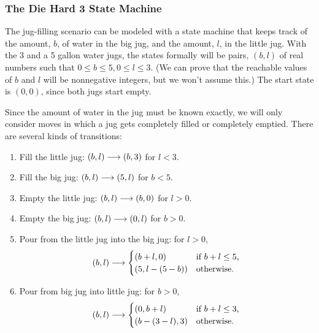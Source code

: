 \subsubsection{The Die Hard 3 State Machine}
The jug-filling scenario can be modeled with a state machine that keeps
track of the amount, $b$, of water in the big jug, and the amount, $l$,
in the little jug.  With the 3 and a 5 gallon water jugs, the states
formally will be pairs, $(b,l)$ of real numbers such that $0 \leq b \leq
5, 0 \leq l \leq 3$.  (We can prove that the reachable values of $b$ and
$l$ will be nonnegative integers, but we won't assume this.)  The start
state is $(0,0)$, since both jugs start empty.

Since the amount of water in the jug must be known exactly, we will only
consider moves in which a jug gets completely filled or completely
emptied.  There are several kinds of transitions:
\begin{enumerate}

\item  Fill the little jug: $(b,l) \mathrel{\longrightarrow} (b,3)$ for $l < 3$.

\item  Fill the big jug: $(b,l) \mathrel{\longrightarrow} (5,l)$ for $b<5$.

\item  Empty the little jug: $(b,l) \mathrel{\longrightarrow} (b,0)$ for $l>0$.

\item  Empty the big jug: $(b,l) \mathrel{\longrightarrow} (0,l)$ for $b>0$.

\item  Pour from the little jug into the big jug: for $l>0$,
\begin{equation*}
(b,l) \mathrel{\longrightarrow}
\begin{cases}
(b+l, 0) & \text{if $b + l \le 5$,}\\
(5, l - (5 - b)) & \text{otherwise.}
\end{cases}
\end{equation*}

\item Pour from big jug into little jug: for $b>0$,
\begin{equation*}
(b,l) \mathrel{\longrightarrow}
\begin{cases}
(0, b+l) & \text{if $b + l \le 3$,}\\
(b - (3 -l), 3) & \text{otherwise.}
\end{cases}
\end{equation*}
\end{enumerate}

